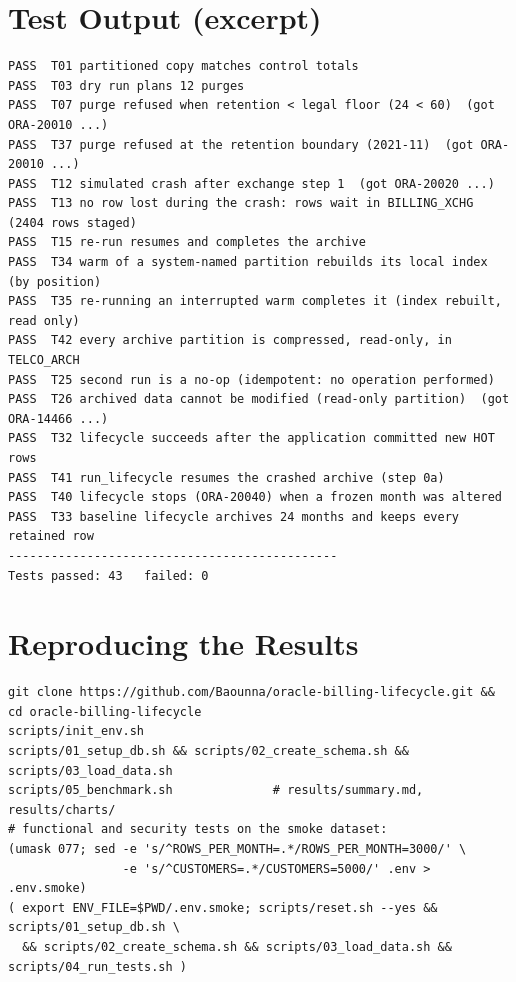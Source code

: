 \chapter{Test Output (excerpt)}

\needspace{0.3\textheight}
\begin{lstlisting}[style=console, caption={\code{results/tests/functional\_tests.txt} (excerpt)}]
PASS  T01 partitioned copy matches control totals
PASS  T03 dry run plans 12 purges
PASS  T07 purge refused when retention < legal floor (24 < 60)  (got ORA-20010 ...)
PASS  T37 purge refused at the retention boundary (2021-11)  (got ORA-20010 ...)
PASS  T12 simulated crash after exchange step 1  (got ORA-20020 ...)
PASS  T13 no row lost during the crash: rows wait in BILLING_XCHG  (2404 rows staged)
PASS  T15 re-run resumes and completes the archive
PASS  T34 warm of a system-named partition rebuilds its local index (by position)
PASS  T35 re-running an interrupted warm completes it (index rebuilt, read only)
PASS  T42 every archive partition is compressed, read-only, in TELCO_ARCH
PASS  T25 second run is a no-op (idempotent: no operation performed)
PASS  T26 archived data cannot be modified (read-only partition)  (got ORA-14466 ...)
PASS  T32 lifecycle succeeds after the application committed new HOT rows
PASS  T41 run_lifecycle resumes the crashed archive (step 0a)
PASS  T40 lifecycle stops (ORA-20040) when a frozen month was altered
PASS  T33 baseline lifecycle archives 24 months and keeps every retained row
----------------------------------------------
Tests passed: 43   failed: 0
\end{lstlisting}

\chapter{Reproducing the Results}

\begin{lstlisting}[style=bash]
git clone https://github.com/Baounna/oracle-billing-lifecycle.git && cd oracle-billing-lifecycle
scripts/init_env.sh
scripts/01_setup_db.sh && scripts/02_create_schema.sh && scripts/03_load_data.sh
scripts/05_benchmark.sh              # results/summary.md, results/charts/
# functional and security tests on the smoke dataset:
(umask 077; sed -e 's/^ROWS_PER_MONTH=.*/ROWS_PER_MONTH=3000/' \
                -e 's/^CUSTOMERS=.*/CUSTOMERS=5000/' .env > .env.smoke)
( export ENV_FILE=$PWD/.env.smoke; scripts/reset.sh --yes && scripts/01_setup_db.sh \
  && scripts/02_create_schema.sh && scripts/03_load_data.sh && scripts/04_run_tests.sh )
\end{lstlisting}
